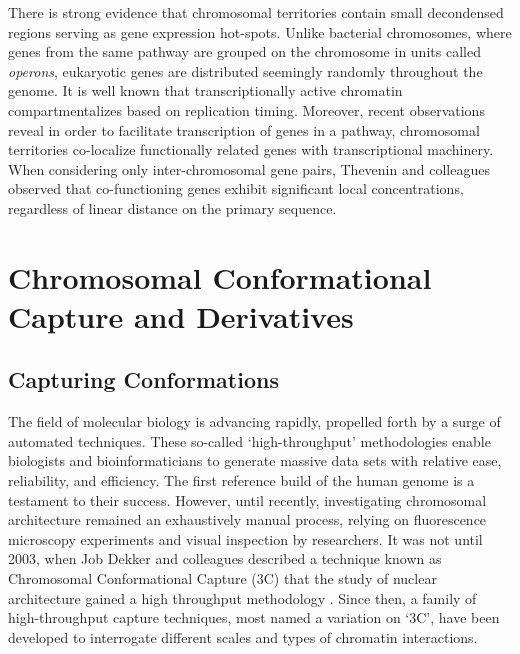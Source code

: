 There is strong evidence that chromosomal territories contain small decondensed regions serving as gene
expression hot-spots.  Unlike bacterial chromosomes, where genes from the same pathway are grouped on the
chromosome in units called \textit{operons}, eukaryotic genes are distributed seemingly randomly throughout
the genome\cite{jacob1961}.  It is well known that transcriptionally active chromatin compartmentalizes based
on replication timing\cite{ferreira1997}\cite{sadoni1999}\cite{thevenin2014}.  Moreover, recent observations
reveal in order to facilitate transcription of genes in a pathway, chromosomal territories co-localize
functionally related genes with transcriptional machinery.  When considering only inter-chromosomal gene pairs,
Thevenin and colleagues observed that co-functioning genes exhibit significant local concentrations, regardless
of linear distance on the primary sequence\cite{thevenin2014}.



\chapter{Chromosomal Conformational Capture and Derivatives}

\section*{Capturing Conformations}

The field of molecular biology is advancing rapidly, propelled forth by a
surge of automated techniques.  These so-called `high-throughput' methodologies
enable biologists and bioinformaticians to generate massive data sets with
relative ease, reliability, and efficiency.  The first reference build of the
human genome is a testament to their success\cite{hgsc2004}.  However,
until recently, investigating chromosomal architecture remained an
exhaustively manual process, relying on fluorescence microscopy experiments and
visual inspection by researchers.  It was not until 2003, when Job Dekker and
colleagues described a technique known as Chromosomal Conformational Capture
(3C) that the study of nuclear architecture gained a high throughput methodology
\cite{dekker2002}. Since then, a family of high-throughput capture techniques,
most named a variation on `3C', have been developed to interrogate
different scales and types of chromatin interactions.

